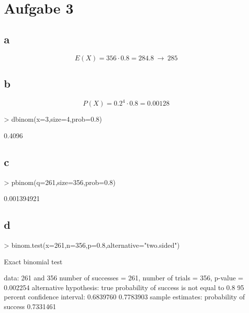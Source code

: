 

\section{Aufgabe 3}

\subsection{a}
\[ E(X) = 356 \cdot 0.8 = 284.8 ~\rightarrow~ 285 \]

\subsection{b}
\[ P(X) = 0.2^4 \cdot 0.8 = 0.00128 \]

\begin{Schunk}
\begin{Sinput}
> dbinom(x=3,size=4,prob=0.8)
\end{Sinput}
\begin{Soutput}
[1] 0.4096
\end{Soutput}
\end{Schunk}

\subsection{c}
\begin{Schunk}
\begin{Sinput}
> pbinom(q=261,size=356,prob=0.8)
\end{Sinput}
\begin{Soutput}
[1] 0.001394921
\end{Soutput}
\end{Schunk}

\subsection{d}
\begin{Schunk}
\begin{Sinput}
> binom.test(x=261,n=356,p=0.8,alternative="two.sided")
\end{Sinput}
\begin{Soutput}
	Exact binomial test

data:  261 and 356 
number of successes = 261, number of trials = 356, p-value = 0.002254
alternative hypothesis: true probability of success is not equal to 0.8 
95 percent confidence interval:
 0.6839760 0.7783903 
sample estimates:
probability of success 
             0.7331461 
\end{Soutput}
\end{Schunk}
